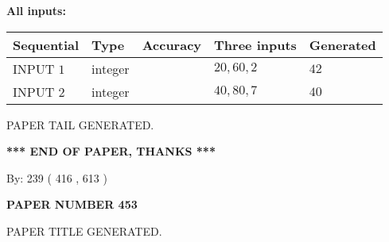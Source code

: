 \documentclass[12pt]{article}
\begin{document}
   
   
   
\noindent\vspace{0.1in}\hspace{-0.08in} {\textbf{\Large{All inputs: }}}
   
   
  
  
\noindent\begin{tabular}{|l|l|l|l|l|}
\hline
 Sequential & Type & Accuracy & Three inputs & Generated \\ 
\hline
 
 
  INPUT $  1 $ & integer &  & $
 20
 , 
 60
 , 
 2
 $ & $ 42 $ 
 \\  \hline  
 
 
  INPUT $  2 $ & integer &  & $
 40
 , 
 80
 , 
 7
 $ & $ 40 $ 
 \\  \hline  
 \end{tabular}
   
   
   
   
   
   
 \vspace{0.2in}
 
   
   
\vspace{2.0in} PAPER TAIL GENERATED.
   
   
   
   
\vspace{1.0in} 
{\textbf{\large{ *** END OF PAPER, THANKS *** }}} 
   
   
\hspace{1.0in} By: 
 239 ( 416 ,  613 )
   
   
   
   
\newpage 
\setcounter{page}{ 
   453001 } 
   
   
   
   
 {\textbf{ \Large{ PAPER NUMBER  453  }}}
   
   
\vspace{0.2in}
   
   
   
   
   
   
   
   
 \vspace{0.2in}
 
 
 
 
   
   
 PAPER TITLE GENERATED.
   
   
   
\vspace{0.2in}
   
\end{document}
